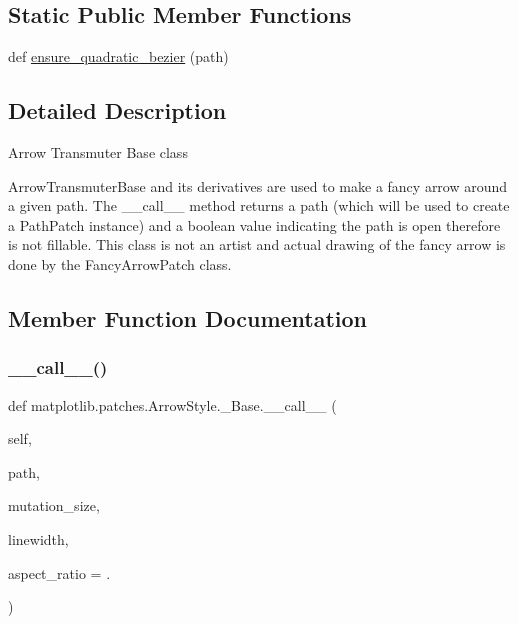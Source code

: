\subsection*{Static Public Member Functions}
\begin{DoxyCompactItemize}
\item 
def \hyperlink{classmatplotlib_1_1patches_1_1ArrowStyle_1_1__Base_a71cf7a38dd76269d0de075449ea799ba}{ensure\+\_\+quadratic\+\_\+bezier} (path)
\end{DoxyCompactItemize}


\subsection{Detailed Description}
\begin{DoxyVerb}Arrow Transmuter Base class

ArrowTransmuterBase and its derivatives are used to make a fancy
arrow around a given path. The __call__ method returns a path
(which will be used to create a PathPatch instance) and a boolean
value indicating the path is open therefore is not fillable.  This
class is not an artist and actual drawing of the fancy arrow is
done by the FancyArrowPatch class.\end{DoxyVerb}
 

\subsection{Member Function Documentation}
\mbox{\label{classmatplotlib_1_1patches_1_1ArrowStyle_1_1__Base_a11d4ecff5c52fbe88934045e623ad254}} 
\subsubsection{\texorpdfstring{\+\_\+\+\_\+call\+\_\+\+\_\+()}{\_\_call\_\_()}}
{\footnotesize\ttfamily def matplotlib.\+patches.\+Arrow\+Style.\+\_\+\+Base.\+\_\+\+\_\+call\+\_\+\+\_\+ (\begin{DoxyParamCaption}\item[{}]{self,  }\item[{}]{path,  }\item[{}]{mutation\+\_\+size,  }\item[{}]{linewidth,  }\item[{}]{aspect\+\_\+ratio = {.} }\end{DoxyParamCaption})}

